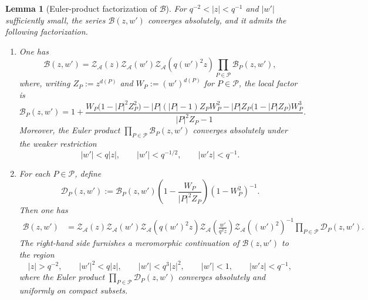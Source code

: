 \documentclass[10pt,a4paper]{amsart}
\newtheorem{lemma}{Lemma}
\newcommand{\A}{\mathcal{A}}
\begin{document}
\begin{lemma}[Euler-product factorization of $\mathcal B$]\label{lem:B}
For $q^{-2}<|z|<q^{-1}$ and $|w'|$ sufficiently small, the series
$\mathcal B(z,w')$ converges absolutely, and it admits the following
factorization.

\begin{enumerate}[label=\textup{(\arabic*)}]
\item
One has
\begin{equation}\label{eq:B-factorization}
\mathcal{B}(z,w')
=
\mathcal Z_{\A}(z)
\mathcal Z_{\A}(w')
\mathcal Z_{\A}(q(w')^2z)
\prod_{P\in\mathcal P}\mathcal{B}_P(z,w'),
\end{equation}
where, writing
$Z_P:=z^{d(P)}$ and $W_P:=(w')^{d(P)}$ for $P\in\mathcal P$,
the local factor is
\begin{equation}\label{eq:BP}
\mathcal B_P(z,w')
=
1+
\frac{
W_P\bigl(1-|P|^2Z_P^2\bigr)
-|P|(|P|-1)Z_PW_P^2
-|P|Z_P\bigl(1-|P|Z_P\bigr)W_P^3
}{
|P|^2Z_P-1
}.
\end{equation}
Moreover, the Euler product
$\prod_{P\in\mathcal P}\mathcal B_P(z,w')$
converges absolutely under the weaker restriction
\begin{equation}\label{eq:B-region}
|w'|<q|z|,
\qquad
|w'|<q^{-1/2},
\qquad
|w'z|<q^{-1}.
\end{equation}

\item
For each $P\in\mathcal P$, define
\begin{equation}\label{eq:DP}
\mathcal D_P(z,w')
:=
\mathcal B_P(z,w')
\left(
1-\frac{W_P}{|P|^2Z_P}
\right)
(1-W_P^2)^{-1}.
\end{equation}
Then one has
\begin{align}\label{eq:B-continuation}
\mathcal{B}(z,w')
&=
\mathcal Z_{\A}(z)
\mathcal Z_{\A}(w')
\mathcal Z_{\A}(q(w')^2z)
\mathcal Z_{\A}\!\left(\frac{w'}{q^2z}\right)
\mathcal Z_{\A}((w')^2)^{-1}
\prod_{P\in\mathcal P}\mathcal{D}_P(z,w').
\end{align}
The right-hand side furnishes a meromorphic continuation of $\mathcal{B}(z,w')$
to the region
\begin{equation}\label{eq:D-region}
|z|>q^{-2},
\qquad
|w'|^2<q|z|,
\qquad
|w'|<q^3|z|^2,
\qquad
|w'|<1,
\qquad
|w'z|<q^{-1},
\end{equation}
where the Euler product
$\prod_{P\in\mathcal P}\mathcal{D}_P(z,w')$
converges absolutely and uniformly on compact subsets.
\end{enumerate}
\end{lemma}
\end{document}
